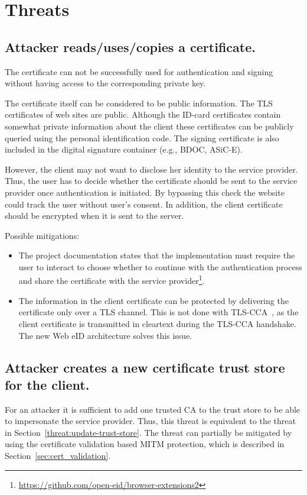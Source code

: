 \newpage
\section{Threats}
\label{sec:threats}


\subsection{Attacker reads/uses/copies a certificate.}
The certificate can not be successfully used for authentication and signing without having access to the corresponding private key.

The certificate itself can be considered to be public information. The TLS certificates of web sites are public. Although the ID-card certificates contain somewhat private information about the client these certificates can be publicly queried using the personal identification code. The signing certificate is also included in the digital signature container (e.g., BDOC, ASiC-E).

However, the client may not want to disclose her identity to the service provider. Thus, the user has to decide whether the certificate should be sent to the service provider once authentication is initiated. By bypassing this check the website could track the user without user's consent. In addition, the client certificate should be encrypted when it is sent to the server.

Possible mitigations:
\begin{itemize}
\item The project documentation states that the implementation must require the user to interact to choose whether to continue with the authentication process and share the certificate with the service provider\footnote{\url{https://github.com/open-eid/browser-extensions2}}.

\item The information in the client certificate can be protected by delivering the certificate only over a TLS channel. This is not done with TLS-CCA~\cite{DBLP:conf/ndss/Parsovs14}, as the client certificate is transmitted in cleartext during the TLS-CCA handshake. The new Web eID architecture solves this issue.
\end{itemize}

 



\subsection{Attacker creates a new certificate trust store for the client.}
\label{threat:create-trust-store}
For an attacker it is sufficient to add one trusted CA to the trust store to be able to impersonate the service provider. Thus, this threat is equivalent to the threat in Section~\ref{threat:update-trust-store}. The threat can partially be mitigated by using the certificate validation based MITM protection, which is described in Section~\ref{sec:cert_validation}.


